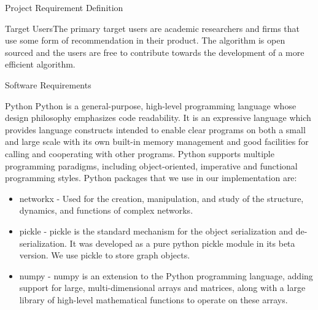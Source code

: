 \documentclass{report}
\begin{document}
\begin{projChapter}{Project Requirement Definition}
\begin{projSection}{Target Users}The primary target users are academic researchers and firms that use some form of recommendation in their product. The algorithm is open sourced and the users are free to contribute towards the development of a more efficient algorithm.\end{projSection}
\begin{projSection}{Software Requirements}
\begin{projSubSection}{Python}
Python is a general-purpose, high-level programming language whose design philosophy emphasizes code readability. It is an expressive language which provides language constructs intended to enable clear programs on both a small and large scale with its own built-in memory management and good facilities for calling and cooperating with other programs. Python supports multiple programming paradigms, including object-oriented, imperative and functional programming styles. Python packages that we use in our implementation are:

\begin{itemize}
  \item networkx - Used for the creation, manipulation, and study of the structure, dynamics, and functions of complex networks.
  \item pickle - pickle is the standard mechanism for the object serialization and de-serialization. It was developed as a pure python pickle module in its beta version.  We use pickle to store graph objects.
  \item numpy -  numpy is an extension to the Python programming language, adding support for large, multi-dimensional arrays and matrices, along with a large library of high-level mathematical functions to operate on these arrays.
\end{itemize}


\end{projSubSection}
\end{projSection}
\end{projChapter}
\end{document}
